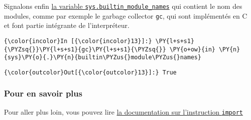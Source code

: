     Signalons enfin
\href{https://docs.python.org/3/library/sys.html\#sys.builtin_module_names}{la
variable \texttt{sys.builtin\_module\_names}} qui contient le nom des
modules, comme par exemple le garbage collector \texttt{gc}, qui sont
implémentés en C et font partie intégrante de l'interpréteur.

    \begin{Verbatim}[commandchars=\\\{\}]
{\color{incolor}In [{\color{incolor}13}]:} \PY{l+s+s1}{\PYZsq{}}\PY{l+s+s1}{gc}\PY{l+s+s1}{\PYZsq{}} \PY{o+ow}{in} \PY{n}{sys}\PY{o}{.}\PY{n}{builtin\PYZus{}module\PYZus{}names}
\end{Verbatim}


\begin{Verbatim}[commandchars=\\\{\}]
{\color{outcolor}Out[{\color{outcolor}13}]:} True
\end{Verbatim}
            
    \hypertarget{pour-en-savoir-plus}{%
\subsubsection{Pour en savoir plus}\label{pour-en-savoir-plus}}

    Pour aller plus loin, vous pouvez lire
\href{https://docs.python.org/3/reference/simple_stmts.html\#the-import-statement}{la
documentation sur l'instruction \texttt{import}}


    
    
    
